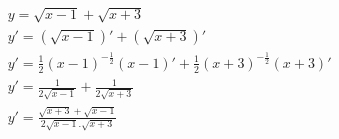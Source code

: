 \begin{ex}
\begin{align}
&y=\sqrt{x-1}+\sqrt{x+3}\nonumber\\
&y'=(\sqrt{x-1})'+(\sqrt{x+3})'\nonumber\\
&y'=\frac{1}{2}(x-1)^{-\frac{1}{2}}(x-1)'+\frac{1}{2}(x+3)^{-\frac{1}{2}}(x+3)'\nonumber\\
&y'=\frac{1}{2\sqrt{x-1}}+\frac{1}{2\sqrt{x+3}}\nonumber\\
&y'=\frac{\sqrt{x+3}+\sqrt{x-1}}{2\sqrt{x-1}.\sqrt{x+3}}\nonumber
\end{align}
\end{ex}